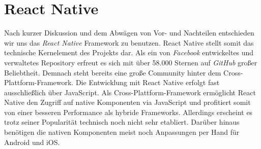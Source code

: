 \section{React Native}
\label{sec:reactnative}
Nach kurzer Diskussion und dem Abwägen von Vor- und Nachteilen entschieden wir uns das \emph{React Native} Framework zu benutzen.
React Native stellt somit das technische Kernelement des Projekts dar.
Als ein von \emph{Facebook} entwickeltes und verwaltetes Repository erfreut es sich mit über 58.000 Sternen auf \emph{GitHub} großer Beliebtheit.
Demnach steht bereits eine große Community hinter dem Cross-Plattform-Framework.
Die Entwicklung mit React Native erfolgt fast ausschließlich über JavaScript.
Als Cross-Plattform-Framework ermöglicht React Native den Zugriff auf native Komponenten via JavaScript und profitiert somit von einer besseren Performance als hybride Frameworks.
Allerdings erscheint es trotz seiner Popularität technisch noch nicht sehr etabliert.
Darüber hinaus benötigen die nativen Komponenten meist noch Anpassungen per Hand für Android und iOS.



